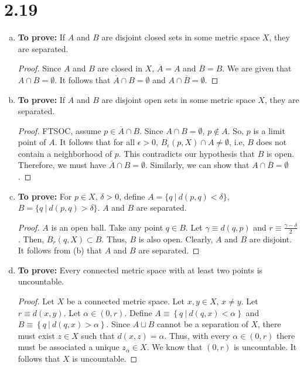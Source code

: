 \documentclass[12pt]{article}
\begin{document}
\section{2.19}
\begin{enumerate}[(a)]
      \item \textbf{To prove:} If $A$ and $B$ are disjoint closed sets in some metric space $X$, they are separated.
            \begin{proof}
                  Since $A$ and $B$ are closed in $X$, $\overline{A}=A$ and $\overline{B}=B$. We are given that $A\cap B=\emptyset$. It follows that $\overline{A}\cap B=\emptyset$ and $A\cap \overline{B}=\emptyset$. 
            \end{proof}
      \item \textbf{To prove:} If $A$ and $B$ are disjoint open sets in some metric space $X$, they are separated.
            \begin{proof}
                  FTSOC, assume $p\in\overline{A}\cap B$. Since 
                  $A\cap B=\emptyset$, $p\not\in A$. So, $p$ is a limit 
                  point of $A$. It follows that for all $\epsilon>0$, 
                  $B_{\epsilon}(p, X)\cap A\ne \emptyset$, i.e, 
                  $B$ does not contain a neighborhood of $p$. This 
                  contradicts our hypothesis that $B$ is open. Therefore, 
                  we must have $\overline{A}\cap B=\emptyset$. Similarly, 
                  we can show that $A\cap \overline{B}=\emptyset$. 
            \end{proof}
      \item \textbf{To prove:} For $p\in X$, $\delta>0$, define $A=\{ q\ |\ d(p, q)<\delta \}$, $B=\{ q \ |\ d(p, q)>\delta \}$. $A$ and $B$ are separated.
            \begin{proof}
                  $A$ is an open ball. Take any point $q\in B$. Let $\gamma\equiv d(q, p)$ and $r\equiv\frac{{\gamma-\delta}}{2}$. Then, $B_{r}(q, X)\subset B$. Thus, $B$ is also open. Clearly, $A$ and $B$ are disjoint. It follows from (b) that $A$ and $B$ are separated.
            \end{proof}
      \item \textbf{To prove:} Every connected metric space with at least two points is uncountable.
            \begin{proof}
                  Let $X$ be a connected metric space. Let 
                  $x, y\in X$, $x\ne y$. Let $r\equiv d(x, y)$. 
                  Let $\alpha\in(0, r)$. 
                  Define $A\equiv\left\{ q\ |\ d(q, x)< \alpha   \right\}$ 
                  and $B\equiv \left\{  q\ | \ d(q, x)> \alpha \right\}$. 
                  Since $A\sqcup B$ cannot be a separation of $X$, 
                  there must exist $z\in X$ such that $d(x, z)=\alpha$. 
                  Thus, with every $\alpha\in(0, r)$ there must be 
                  associated a unique $z_{\alpha}\in X$. We know that 
                  $(0, r)$ is uncountable. It follows that $X$ is 
                  uncountable.
            \end{proof}
\end{enumerate}
\end{document}
